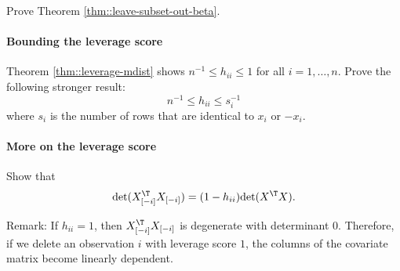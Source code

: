 Prove Theorem \ref{thm::leave-subset-out-beta}. 





\paragraph{Bounding the leverage score}
\label{hw10::bounding-h-more}


Theorem \ref{thm::leverage-mdist} shows $ n^{-1} \leq h_{ii} \leq 1$ for all $i = 1, \ldots , n$.
Prove the following stronger result:
$$
n^{-1} \leq h_{ii} \leq   s_i^{-1}
$$
where $s_i$ is the number of rows that are identical to $x_i$ or $-x_i$.



 

\paragraph{More on the leverage score}
\label{hw10::h-grammatrix}
 
Show that 
$$
\text{det}(X_{[-i]}^{\T}X_{[-i]}) = (1-h_{ii}) \text{det}(X^{\T} X). 
$$ 
 
 
 
Remark: If $h_{ii} =1$, then $X_{[-i]}^{\T}X_{[-i]}$ is degenerate with determinant $0$. Therefore, if we delete an observation $i$ with leverage score $1$, the columns of the covariate matrix become linearly dependent. 
